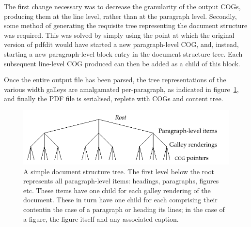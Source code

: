 The first change necessary was to decrease the granularity of the output COGs, producing them at the line level, rather than at the paragraph level. Secondly, some method of generating the requisite tree representing the document structure was required. This was solved by simply using the point at which the original version of pdfdit would have started a new paragraph-level COG, and, instead, starting a new paragraph-level block entry in the document structure tree. Each subsequent line-level COG produced can then be added as a child of this block.

Once the entire output file has been parsed, the tree representations of the various width galleys are amalgamated per-paragraph, as indicated in figure~\ref{fig:tree}, and finally the PDF file is serialised, replete with COGs and content tree.

\begin{figure}
 \includegraphics[width=\textwidth]{gfx/tree}
 \caption[A simple document structure tree]{A simple document structure tree. The first level below the root represents all paragraph-level items: headings, paragraphs, figures etc. These items have one child for each galley rendering of the document. These in turn have one child for each \COG{} comprising their content\ed{}in the case of a paragraph or heading its lines; in the case of a figure, the figure itself and any associated caption.}
 \label{fig:tree}
\end{figure}

